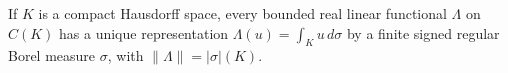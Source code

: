 If \(K\) is a compact Hausdorff space, every bounded real linear functional \(\Lambda\) on \(C(K)\) has a unique representation \(\Lambda(u)=\int_Ku\,d\sigma\) by a finite signed regular Borel measure \(\sigma\), with \(\|\Lambda\|=|\sigma|(K)\).